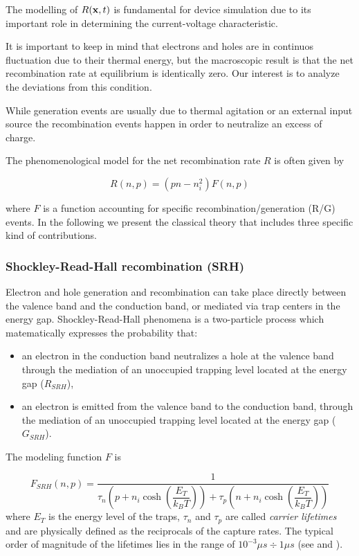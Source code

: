 The modelling of $R(\mathbf{x},t)$ is fundamental for device simulation due to its important role in determining the current-voltage characteristic.
 
It is important to keep in mind that electrons and holes are in continuos fluctuation due to their thermal energy, but the macroscopic result is that the net recombination rate at equilibrium  is identically zero. Our interest is to analyze the deviations from this condition. 

While generation events are usually due to thermal agitation or an external input source the recombination events happen in order to neutralize an excess of charge.

The phenomenological model for the net recombination rate $R$ is often given by 

\begin{equation}
\label{eq: generic RG}
R(n,p) = (pn-n_i^2)F(n,p)
\end{equation}

where $F$ is a function accounting for specific recombination/generation (R/G) events.
In the following we present the classical theory that includes three specific kind of contributions. 

\subsubsection{Shockley-Read-Hall recombination (SRH)}

Electron and hole generation and recombination can take place directly between the valence band and the conduction band, or mediated via trap centers in the energy gap. Shockley-Read-Hall phenomena is a two-particle process which matematically expresses the probability that:
\begin{itemize}
\item an electron in the conduction band neutralizes a hole at the valence band through the mediation of an unoccupied trapping level located at the energy gap ($R_{SRH}$),
\item an electron is emitted from the valence band to the conduction band, through the mediation of an unoccupied trapping level located at the energy gap ($G_{SRH}$).
\end{itemize}

The modeling function $F$ is

\begin{equation}
F_{SRH}(n,p) = \dfrac{1}{\tau_n\left(p+n_i \cosh\left(\dfrac{E_T}{k_BT} \right) \right)+\tau_p\left(n+n_i \cosh\left(\dfrac{E_T}{k_BT}\right) \right)}
\end{equation}
where $E_T$ is the energy level of the traps, $\tau_n$ and $\tau_p$ are called \textit{carrier lifetimes} and are physically defined as the reciprocals of the capture rates. The typical order of magnitude of the lifetimes lies in the range of $10^{-3}\mu s\div 1 \mu s$ (see  \cite{VanOver:SRH} and \cite{Goebel:SRH}). 

